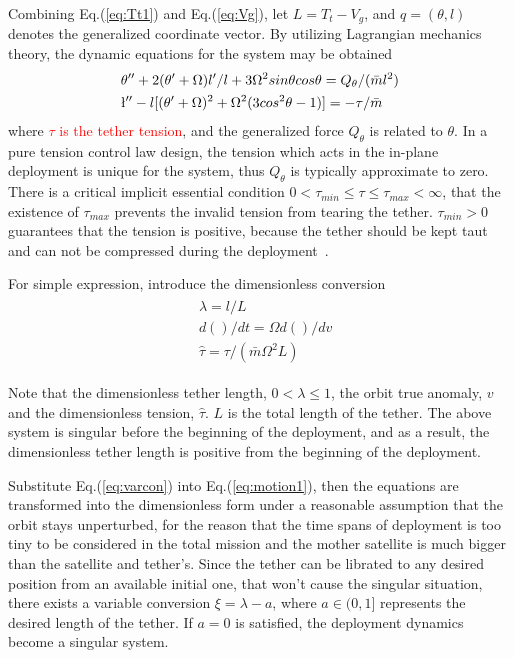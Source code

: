 \documentclass[3p]{elsarticle}
\theoremstyle{plain}
\begin{document}
Combining Eq.(\ref{eq:Tt1}) and Eq.(\ref{eq:Vg}), let $L =T_t-V_g$, and ${q}=(\theta,l)$ denotes the generalized coordinate vector. By utilizing Lagrangian mechanics theory, the dynamic equations for the system may be obtained~\cite{Williams2009745}
\begin{align}
\begin{split}
&\theta''+2(\theta'+\Omega)l'/l+3\Omega^2sin{\theta} cos{\theta}=Q_\theta/(\bar{m}l^2)\\
&\l''-l[(\theta'+\Omega)^2+\Omega^2(3cos{^2\theta}-1)]= -\tau/\bar{m}\label{eq:motion1}
\end{split}
\end{align}
where \textcolor{red}{$\tau$ is the tether tension}, and the generalized force $Q_\theta$ is related to $\theta$. In a pure tension control law design, the tension which acts in the in-plane deployment is unique for the system, thus $Q_\theta$ is typically approximate to zero. There is a critical implicit essential condition $0<\tau_{min}\le \tau\le \tau_{max} < \infty$, that the existence of $\tau_{max}$ prevents the invalid tension from tearing the tether. $\tau_{min}>0$ guarantees that the tension is positive, because the tether should be kept taut and can not be compressed during the deployment~\cite{williams2008deployment}.\par
For simple expression, introduce the dimensionless conversion
\begin{align}
\begin{split}
&\lambda=l/L\\
&d()/dt=\Omega d()/dv\\
&\hat{\tau}=\tau/(\bar{m}\Omega^2L)\label{eq:varcon}
\end{split}
\end{align}\par
Note that the dimensionless tether length, $0<\lambda \le 1$, the orbit true anomaly, $v$ and the dimensionless tension, $\hat{\tau}$. $L$ is the total length of the tether. The above system is singular before the beginning of the deployment, and as a result, the dimensionless tether length is positive from the beginning of the deployment.\par
Substitute Eq.(\ref{eq:varcon}) into Eq.(\ref{eq:motion1}), then the equations are transformed into the dimensionless form under a reasonable assumption that the orbit stays unperturbed, for the reason that the time spans of deployment is too tiny to be considered in the total mission and the mother satellite is much bigger than the satellite and tether's.
Since the tether can be librated to any desired position from an available initial one, that won't cause the singular situation, there exists a variable conversion $\xi =\lambda - a$, where $a\in(0,1]$ represents the desired length of the tether. If $a=0$ is satisfied, the deployment dynamics become a singular system.\par
\end{document}
